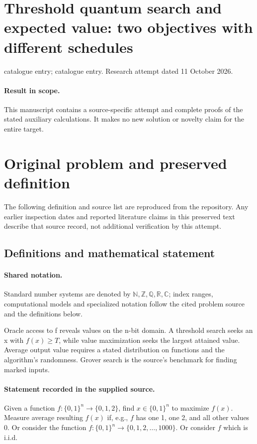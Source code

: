 \documentclass[11pt]{article}
\begin{document}
\section*{Threshold quantum search and expected value: two objectives with different schedules}
\noindent catalogue entry; catalogue entry. Research attempt dated 11 October 2026.
\paragraph{Result in scope.}This manuscript contains a source-specific attempt and complete proofs of the stated auxiliary calculations. It makes no new solution or novelty claim for the entire target.
\section{Original problem and preserved definition}
The following definition and source list are reproduced from the repository. Any earlier inspection dates and reported literature claims in this preserved text describe that source record, not additional verification by this attempt.
\subsection{Definitions and mathematical statement}

\paragraph{Shared notation.}Standard number systems are denoted by $\mathbb N,\mathbb Z,\mathbb Q,\mathbb R,\mathbb C$; index ranges, computational models and specialized notation follow the cited problem source and the definitions below.


Oracle access to f reveals values on the n-bit domain. A threshold search seeks an x with $f(x)\ge T$, while value maximization seeks the largest attained value. Average output value requires a stated distribution on functions and the algorithm's randomness. Grover search is the source's benchmark for finding marked inputs.
\paragraph{Statement recorded in the supplied source.}
Given a function $f:\{0,1\}^n \to \{0,1,2\}$, find $x\in \{0,1\}^n$ to maximize $f(x)$. Measure average resulting $f(x)$ if, e.g., $f$ has one 1, one 2, and all other values 0. Or consider the function $f:\{0,1\}^n \to \{0,1,2, \dots, 1000\}$. Or consider $f$ which is i.i.d.
\end{document}
